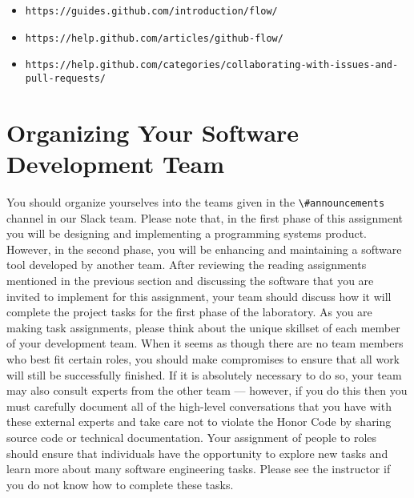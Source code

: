 \documentclass[11pt]{article}
\newcommand{\url}[1]{\lstinline{#1}}
\newcommand{\channel}[1]{\lstinline{#1}}
\begin{document}
\vspace*{-.5em}

\begin{itemize}
  \setlength{\itemsep}{0pt}
  \item \url{https://guides.github.com/introduction/flow/}
  \item \url{https://help.github.com/articles/github-flow/}
  \item \url{https://help.github.com/categories/collaborating-with-issues-and-pull-requests/}
\end{itemize}

\vspace*{-1em}

\section*{Organizing Your Software Development Team}

You should organize yourselves into the teams given in the \channel{\#announcements} channel in our Slack team. Please
note that, in the first phase of this assignment you will be designing and implementing a programming systems product.
However, in the second phase, you will be enhancing and maintaining a software tool developed by another team. After
reviewing the reading assignments mentioned in the previous section and discussing the software that you are invited to
implement for this assignment, your team should discuss how it will complete the project tasks for the first phase of
the laboratory. As you are making task assignments, please think about the unique skillset of each member of your
development team. When it seems as though there are no team members who best fit certain roles, you should make
compromises to ensure that all work will still be successfully finished. If it is absolutely necessary to do so, your
team may also consult experts from the other team --- however, if you do this then you must carefully document all of
the high-level conversations that you have with these external experts and take care not to violate the Honor Code by
sharing source code or technical documentation. Your assignment of people to roles should ensure that individuals have
the opportunity to explore new tasks and learn more about many software engineering tasks. Please see the instructor if
you do not know how to complete these tasks.
\end{document}
